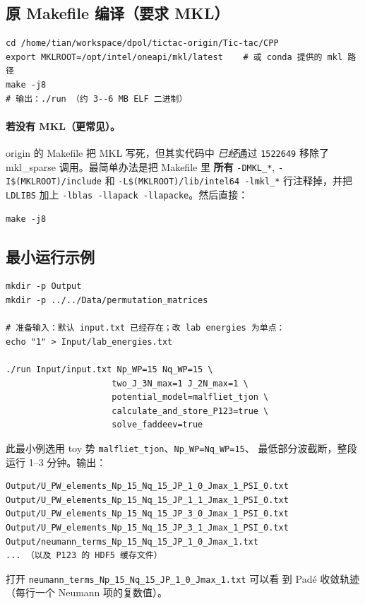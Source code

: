 \subsection{原 Makefile 编译（要求 MKL）}
\begin{lstlisting}[style=config]
cd /home/tian/workspace/dpol/tictac-origin/Tic-tac/CPP
export MKLROOT=/opt/intel/oneapi/mkl/latest    # 或 conda 提供的 mkl 路径
make -j8
# 输出：./run （约 3--6 MB ELF 二进制）
\end{lstlisting}

\paragraph{若没有 MKL（更常见）。}
origin 的 Makefile 把 MKL 写死，但其实代码中 \emph{已经}通过
\texttt{1522649} 移除了 mkl\_sparse 调用。最简单办法是把
Makefile 里 \textbf{所有} \texttt{-DMKL\_*}, \texttt{-I\$(MKLROOT)/include}
和 \texttt{-L\$(MKLROOT)/lib/intel64 -lmkl\_*} 行注释掉，并把
\texttt{LDLIBS} 加上 \texttt{-lblas -llapack -llapacke}。然后直接：
\begin{lstlisting}[style=config]
make -j8
\end{lstlisting}

\subsection{最小运行示例}
\begin{lstlisting}[style=config]
mkdir -p Output
mkdir -p ../../Data/permutation_matrices

# 准备输入：默认 input.txt 已经存在；改 lab energies 为单点：
echo "1" > Input/lab_energies.txt

./run Input/input.txt Np_WP=15 Nq_WP=15 \
                     two_J_3N_max=1 J_2N_max=1 \
                     potential_model=malfliet_tjon \
                     calculate_and_store_P123=true \
                     solve_faddeev=true
\end{lstlisting}
此最小例选用 toy 势 \texttt{malfliet\_tjon}、\texttt{Np\_WP=Nq\_WP=15}、
最低部分波截断，整段运行 1--3 分钟。输出：
\begin{lstlisting}[style=config]
Output/U_PW_elements_Np_15_Nq_15_JP_1_0_Jmax_1_PSI_0.txt
Output/U_PW_elements_Np_15_Nq_15_JP_1_1_Jmax_1_PSI_0.txt
Output/U_PW_elements_Np_15_Nq_15_JP_3_0_Jmax_1_PSI_0.txt
Output/U_PW_elements_Np_15_Nq_15_JP_3_1_Jmax_1_PSI_0.txt
Output/neumann_terms_Np_15_Nq_15_JP_1_0_Jmax_1.txt
... （以及 P123 的 HDF5 缓存文件）
\end{lstlisting}
打开 \texttt{neumann\_terms\_Np\_15\_Nq\_15\_JP\_1\_0\_Jmax\_1.txt} 可以看
到 Padé 收敛轨迹（每行一个 Neumann 项的复数值）。

